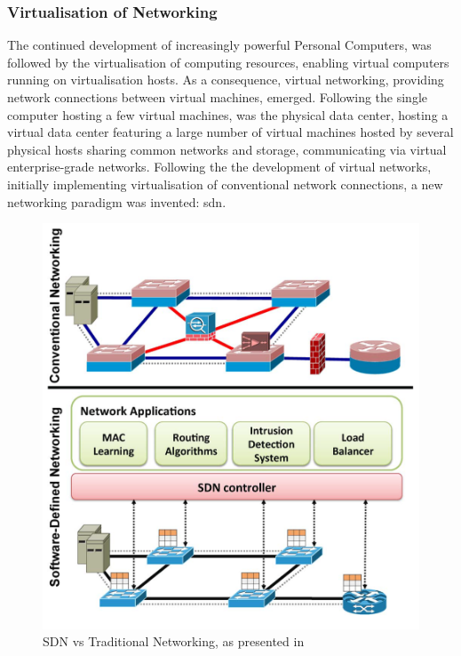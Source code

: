 \subsubsection{Virtualisation of Networking}

The continued development of increasingly powerful Personal Computers, was followed by the virtualisation of 
computing resources, enabling virtual computers running on virtualisation hosts. As a consequence, virtual networking, providing network connections between virtual machines, emerged. Following the single computer hosting a few virtual machines, was the physical data center, hosting a virtual data center featuring a large number of virtual machines hosted by several physical hosts sharing common networks and storage, communicating via virtual enterprise-grade networks. Following the the development of virtual networks, initially implementing virtualisation of conventional network connections, a new networking paradigm was invented: \acrfull{sdn}. 

 \begin{figure}[ht]
\centering
    \includegraphics[width=\textwidth]{figures/SDNvsTradNetwork.png}
\caption{SDN vs Traditional Networking, as presented in \cite[p. 19]{kreutz2014software}}

\end{figure}



